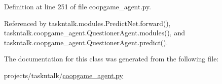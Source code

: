 Definition at line 251 of file coopgame\+\_\+agent.\+py.



Referenced by taskntalk.\+modules.\+Predict\+Net.\+forward(), taskntalk.\+coopgame\+\_\+agent.\+Questioner\+Agent.\+modules(), and taskntalk.\+coopgame\+\_\+agent.\+Questioner\+Agent.\+predict().



The documentation for this class was generated from the following file\+:\begin{DoxyCompactItemize}
\item 
projects/taskntalk/\hyperlink{coopgame__agent_8py}{coopgame\+\_\+agent.\+py}\end{DoxyCompactItemize}

